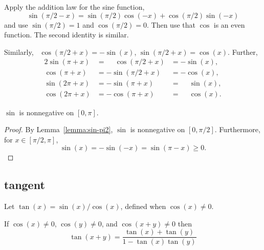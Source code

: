 \begin{proved}
Apply the addition law for the sine function,
\[ 
\sin(\pi/2 - x) = \sin(\pi/2)\cos(-x) + \cos(\pi/2)\sin(-x)
\] 
and use $\sin(\pi/2) = 1$ and
$\cos(\pi/2) = 0$.  Then use that $\cos$ is an
even function.  The second identity is
similar.  \swallowed\end{proved}

Similarly,~%
$\cos(\pi/2 + x) =
-\sin(x)$, $\sin(\pi/2 + x) = \cos(x)$.  Further,
\begin{alignat}{2}
\label{eqn:periodic}
\sin(\pi + x) &= \phantom{-}\cos(\pi/2 + x) &= -\sin(x),\nonumber\\
\cos(\pi + x) &= -\sin(\pi/2 + x) &= -\cos(x),\nonumber\\
\sin(2\pi + x) &= -\sin(\pi + x) &= \phantom{-}\sin(x),\\
\cos(2\pi + x) &= -\cos(\pi + x) &= \phantom{-}\cos(x)\nonumber.
\end{alignat}
%
%
%

\begin{lemma}[]\label{lemma:sin-pos}
$\sin$ is nonnegative on $[0,\pi]$.
\end{lemma}

\begin{proof} By Lemma~\ref{lemma:sin-pi2}, $\sin$ is nonnegative on
  $[0,\pi/2]$.  Furthermore, for $x\in[\pi/2,\pi]$,
\[ 
  \sin(x) = -\sin(-x)   =  \sin(\pi-x) \ge 0.
\] 
\end{proof}



\subsection{tangent}
\label{sec:tangent}

\begin{definition}[tangent]\label{def:tan}
Let $\tan(x) = \sin(x)/\cos(x)$, defined when $\cos(x)\ne0$.
%
%
\end{definition}



\begin{lemma}[]
\label{lemma:tan-add}
If $\cos(x)\ne 0$, $\cos(y)\ne 0$, and $\cos(x+y)\ne0$ then
\[ \tan(x+y) = \frac{\tan(x) + \tan(y) }{ 1 -
    \tan(x)\tan(y)}\] 
\end{lemma}
%

